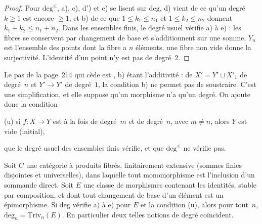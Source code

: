 \begin{proof}
Pour $\mathrm{deg}^{\leq}$, a), c), d$'$) et e) se lisent sur $\mathrm{deg}$, d) vient de ce qu'un degré $k \geq 1$ est encore $\geq 1$, et b) de ce que $1 \leq k_1 \leq n_1$ et $1 \leq k_2 \leq n_2$ donnent $k_1 + k_2 \leq n_1 + n_2$. Dans les ensembles finis, le degré usuel vérifie a) à e) : les fibres se conservent par changement de base et s'additionnent sur une somme, $Y_n$ est l'ensemble des points dont la fibre a $n$ éléments, une fibre non vide donne la surjectivité. L'identité d'un point n'y est pas de degré~$2$.
\end{proof}

Le pas de la page~214 qui cède est , b) étant l'additivité : de $X' = Y' \sqcup X'_1$ de degré~$n$ et $Y' \to Y'$ de degré~$1$, la condition b) ne permet pas de soustraire. C'est une simplification, et elle suppose qu'un morphisme n'a qu'un degré. On ajoute donc la condition

\smallskip
\noindent (u) si $f : X \to Y$ est à la fois de degré~$m$ et de degré~$n$, avec $m \neq n$, alors $Y$ est vide (initial),
\smallskip

\noindent que le degré usuel des ensembles finis vérifie, et que $\mathrm{deg}^{\leq}$ ne vérifie pas.

\begin{encadre}
\begin{theoreme}
Soit $C$ une catégorie à produits fibrés, finitairement extensive (sommes finies disjointes et universelles), dans laquelle tout monomorphisme est l'inclusion d'un sommande direct. Soit $E$ une classe de morphismes contenant les identités, stable par composition, et dont tout changement de base d'un élément est un épimorphisme. Si $\mathrm{deg}$ vérifie a) à e) pour $E$ et la condition (u), alors pour tout~$n$, $\mathrm{deg}_n = \mathrm{Triv}_n(E)$. En particulier deux telles notions de degré coïncident.
\end{theoreme}
\end{encadre}

